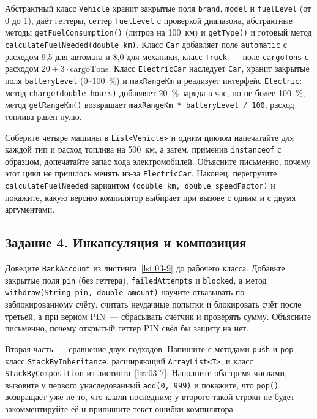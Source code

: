 Абстрактный класс \texttt{Vehicle} хранит закрытые поля \texttt{brand},
\texttt{model} и \texttt{fuelLevel} (от 0 до 1), даёт геттеры, сеттер
\texttt{fuelLevel} с проверкой диапазона, абстрактные методы
\texttt{getFuelConsumption()} (литров на 100~км) и \texttt{getType()} и готовый
метод \texttt{calculateFuelNeeded(double km)}. Класс \texttt{Car} добавляет
поле \texttt{automatic} с расходом 9,5 для автомата и 8,0 для механики, класс
\texttt{Truck}~--- поле \texttt{cargoTons} с расходом
$20 + 3 \cdot \text{cargoTons}$. Класс \texttt{ElectricCar} наследует
\texttt{Car}, хранит закрытые поля \texttt{batteryLevel} (0--100~\%) и
\texttt{maxRangeKm} и реализует интерфейс \texttt{Electric}: метод
\texttt{charge(double hours)} добавляет 20~\% заряда в час, но не более
100~\%, метод \texttt{getRangeKm()} возвращает
\texttt{maxRangeKm * batteryLevel / 100}, расход топлива равен нулю.

Соберите четыре машины в \texttt{List<Vehicle>} и одним циклом напечатайте для
каждой тип и расход топлива на 500~км, а затем, применив \texttt{instanceof} с
образцом, допечатайте запас хода электромобилей.
Объясните письменно, почему этот цикл не пришлось менять из-за
\texttt{ElectricCar}. Наконец, перегрузите \texttt{calculateFuelNeeded}
вариантом \texttt{(double km, double speedFactor)} и покажите, какую версию
компилятор выбирает при вызове с одним и с двумя аргументами.

\subsection*{Задание 4. Инкапсуляция и композиция}

Доведите \texttt{BankAccount} из листинга~\ref{lst:03-9} до рабочего класса.
Добавьте закрытые поля \texttt{pin} (без геттера),
\texttt{failedAttempts} и \texttt{blocked}, а метод
\texttt{withdraw(String pin, double amount)} научите отказывать по
заблокированному счёту, считать неудачные попытки и блокировать счёт после
третьей, а при верном PIN~--- сбрасывать счётчик и проверять сумму. Объясните
письменно, почему открытый геттер PIN свёл бы защиту на нет.

Вторая часть~--- сравнение двух подходов. Напишите с методами \texttt{push} и
\texttt{pop} класс \texttt{StackByInheritance}, расширяющий
\texttt{ArrayList<T>}, и класс \texttt{StackByComposition} из
листинга~\ref{lst:03-7}. Наполните оба тремя числами, вызовите у первого
унаследованный \texttt{add(0, 999)} и покажите, что \texttt{pop()} возвращает
уже не то, что клали последним; у второго такой строки не будет~---
закомментируйте её и припишите текст ошибки компилятора.

